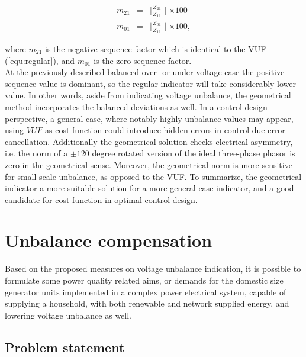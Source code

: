             \begin{equation}
                \begin{array}{rcl}
                       m_{21}&=&\mid\frac{Z_{21}}{Z_{11}}\mid\times100\\
                       m_{01}&=&\mid\frac{Z_{01}}{Z_{11}}\mid\times100,
                \end{array}
                \label{equ:factor}
            \end{equation}

where $m_{21}$ is the negative sequence factor which is identical to the VUF (\ref{equ:regular}), and $m_{01}$ is the zero sequence factor.\\
At the previously described balanced over- or under-voltage case the positive sequence value is dominant, so the regular indicator will take considerably lower value. In other words, aside from indicating voltage unbalance, the geometrical method incorporates the balanced deviations as well. In a control design perspective, a general case, where notably highly unbalance values may appear, using $VUF$ as cost function could introduce hidden errors in control due error cancellation. Additionally the geometrical solution checks electrical asymmetry, i.e. the norm of a $\pm120$ degree rotated version of the ideal three-phase phasor is zero in the geometrical sense. Moreover, the geometrical norm is more sensitive for small scale unbalance, as opposed to the VUF. To summarize, the geometrical indicator a more suitable solution for a more general case indicator, and a good candidate for cost function in optimal control design.

\section{Unbalance compensation}\label{VUB:sec:Compensation}

Based on the proposed measures on voltage unbalance indication, it is possible to formulate some power quality related aims, or demands for the domestic size generator units implemented in a complex power electrical system, capable of supplying a household, with both renewable and network supplied energy, and lowering voltage unbalance as well.

\subsection{Problem statement}\label{VUB:sec:Statement}

